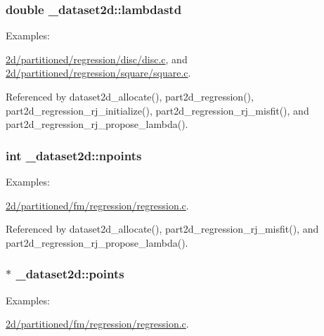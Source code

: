 \subsubsection[{\texorpdfstring{lambdastd}{lambdastd}}]{\setlength{\rightskip}{0pt plus 5cm}double \+\_\+dataset2d\+::lambdastd}\hypertarget{struct__dataset2d_a7207b67831f172d5166fdba9808cdf28}{}\label{struct__dataset2d_a7207b67831f172d5166fdba9808cdf28}
\begin{Desc}
\item[Examples\+: ]\par
\hyperlink{2d_2partitioned_2regression_2disc_2disc_8c-example}{2d/partitioned/regression/disc/disc.\+c}, and \hyperlink{2d_2partitioned_2regression_2square_2square_8c-example}{2d/partitioned/regression/square/square.\+c}.\end{Desc}


Referenced by dataset2d\+\_\+allocate(), part2d\+\_\+regression(), part2d\+\_\+regression\+\_\+rj\+\_\+initialize(), part2d\+\_\+regression\+\_\+rj\+\_\+misfit(), and part2d\+\_\+regression\+\_\+rj\+\_\+propose\+\_\+lambda().

\subsubsection[{\texorpdfstring{npoints}{npoints}}]{\setlength{\rightskip}{0pt plus 5cm}int \+\_\+dataset2d\+::npoints}\hypertarget{struct__dataset2d_a56b62d44c3ab4ddb0fb65029192f2a5e}{}\label{struct__dataset2d_a56b62d44c3ab4ddb0fb65029192f2a5e}
\begin{Desc}
\item[Examples\+: ]\par
\hyperlink{2d_2partitioned_2fm_2regression_2regression_8c-example}{2d/partitioned/fm/regression/regression.\+c}.\end{Desc}


Referenced by dataset2d\+\_\+allocate(), part2d\+\_\+regression\+\_\+rj\+\_\+misfit(), and part2d\+\_\+regression\+\_\+rj\+\_\+propose\+\_\+lambda().

\subsubsection[{\texorpdfstring{points}{points}}]{$\ast$ \+\_\+dataset2d\+::points}\hypertarget{struct__dataset2d_ad1246d82ce3af334ee62bcda7d96d010}{}\label{struct__dataset2d_ad1246d82ce3af334ee62bcda7d96d010}
\begin{Desc}
\item[Examples\+: ]\par
\hyperlink{2d_2partitioned_2fm_2regression_2regression_8c-example}{2d/partitioned/fm/regression/regression.\+c}.\end{Desc}


